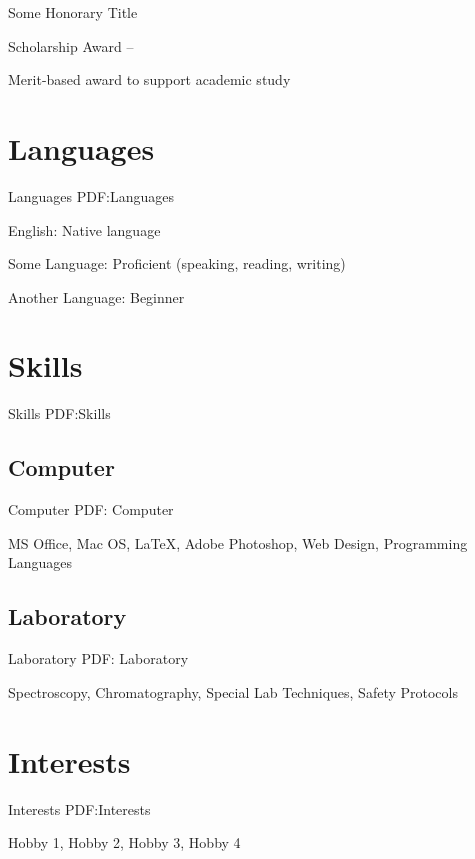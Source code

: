 \documentclass[letterpaper,9pt,oneside]{article}
\begin{document}
\begin{body}
\EntryGap
Some Honorary Title
\hfill
{}

\EntryGap
Scholarship Award
\hfill 
{} --
\begin{detail}
Merit-based award to support academic study 
\end{detail}

\EntryGap



\section
{Languages}
{Languages}
{PDF:Languages}

English: Native language 
\par
Some Language: Proficient (speaking, reading, writing)
\par
Another Language: Beginner



\section
{Skills}
{Skills}
{PDF:Skills}

\subsection
{Computer}
{Computer}
{PDF: Computer}

MS Office, Mac OS, {\LaTeX}, Adobe Photoshop, Web Design, Programming Languages 

\EntryGap
\subsection
{Laboratory}
{Laboratory}
{PDF: Laboratory}

Spectroscopy, Chromatography, Special Lab Techniques, Safety Protocols 


\section
{Interests}
{Interests}
{PDF:Interests}

Hobby 1, Hobby 2, Hobby 3, Hobby 4




\end{body}
\end{document}

